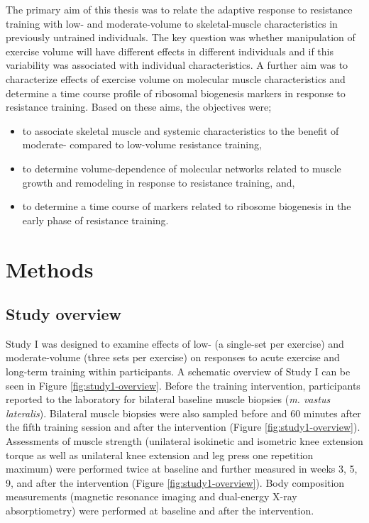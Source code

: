\documentclass[twoside,10pt]{gihclass} %
\providecommand{\tightlist}{%
  \setlength{\itemsep}{0pt}\setlength{\parskip}{0pt}}
\begin{document}
The primary aim of this thesis was to relate the adaptive response to resistance training with low- and moderate-volume to skeletal-muscle characteristics in previously untrained individuals. The key question was whether manipulation of exercise volume will have different effects in different individuals and if this variability was associated with individual characteristics. A further aim was to characterize effects of exercise volume on molecular muscle characteristics and determine a time course profile of ribosomal biogenesis markers in response to resistance training. Based on these aims, the objectives were;
\begin{itemize}
\tightlist
\item
  to associate skeletal muscle and systemic characteristics to the benefit of moderate- compared to low-volume resistance training,
\item
  to determine volume-dependence of molecular networks related to muscle growth and remodeling in response to resistance training, and,
\item
  to determine a time course of markers related to ribosome biogenesis in the early phase of resistance training.
\end{itemize}
\hypertarget{methods}{%
\chapter{Methods}\label{methods}}

\hypertarget{study-overview}{%
\section{Study overview}\label{study-overview}}

Study I was designed to examine effects of low- (a single-set per exercise) and moderate-volume (three sets per exercise) on responses to acute exercise and long-term training within participants.
A schematic overview of Study I can be seen in Figure \ref{fig:study1-overview}.
Before the training intervention, participants reported to the laboratory for bilateral baseline muscle biopsies (\emph{m. vastus lateralis}).
Bilateral muscle biopsies were also sampled before and 60 minutes after the fifth training session and after the intervention (Figure \ref{fig:study1-overview}).
Assessments of muscle strength (unilateral isokinetic and isometric knee extension torque as well as unilateral knee extension and leg press one repetition maximum) were performed twice at baseline and further measured in weeks 3, 5, 9, and after the intervention (Figure \ref{fig:study1-overview}).
Body composition measurements (magnetic resonance imaging and dual-energy X-ray absorptiometry) were performed at baseline and after the intervention.
\end{document}
